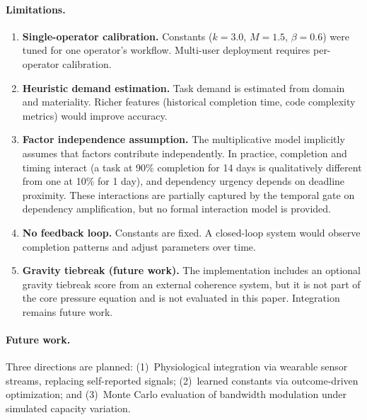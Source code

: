 \documentclass[11pt]{article}
\begin{document}
\paragraph{Limitations.}
\begin{enumerate}[nosep]
  \item \textbf{Single-operator calibration.}
        Constants ($k = 3.0$, $M = 1.5$, $\beta = 0.6$) were
        tuned for one operator's workflow.  Multi-user deployment
        requires per-operator calibration.
  \item \textbf{Heuristic demand estimation.}
        Task demand is estimated from domain and materiality.
        Richer features (historical completion time, code
        complexity metrics) would improve accuracy.
  \item \textbf{Factor independence assumption.}
        The multiplicative model implicitly assumes that factors
        contribute independently.  In practice, completion and
        timing interact (a task at 90\% completion for 14 days
        is qualitatively different from one at 10\% for 1 day),
        and dependency urgency depends on deadline proximity.
        These interactions are partially captured by the temporal
        gate on dependency amplification, but no formal interaction
        model is provided.
  \item \textbf{No feedback loop.}
        Constants are fixed.  A closed-loop system would observe
        completion patterns and adjust parameters over time.
  \item \textbf{Gravity tiebreak (future work).}
        The implementation includes an optional gravity tiebreak
        score from an external coherence system, but it is not
        part of the core pressure equation and is not evaluated
        in this paper.  Integration remains future work.
\end{enumerate}

\paragraph{Future work.}
Three directions are planned:
(1)~Physiological integration via wearable sensor streams,
replacing self-reported signals;
(2)~learned constants via outcome-driven optimization; and
(3)~Monte Carlo evaluation of bandwidth modulation under
simulated capacity variation.

\end{document}
